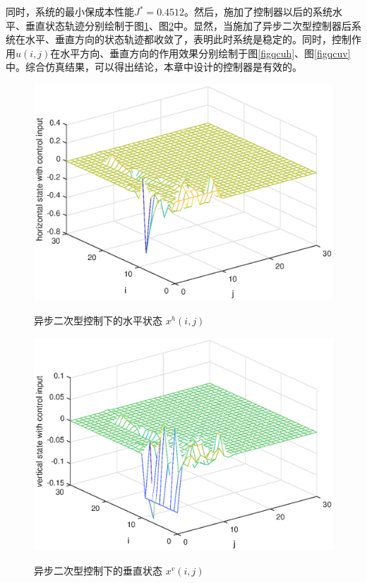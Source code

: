 	同时，系统的最小保成本性能$J^{*}=0.4512$。然后，施加了控制器以后的系统水平、垂直状态轨迹分别绘制于图\ref{figqchstate1}、图\ref{figqcvstate1}中。显然，当施加了异步二次型控制器后系统在水平、垂直方向的状态轨迹都收敛了，表明此时系统是稳定的。同时，控制作用$u(i,j)$在水平方向、垂直方向的作用效果分别绘制于图\ref{figqcuh}、图\ref{figqcuv}中。综合仿真结果，可以得出结论，本章中设计的控制器是有效的。
	\begin{figure}[!htb]
		\centering\includegraphics[scale=0.6]{./figures/qc/simulation/hstate.eps}\\ 
		\caption{异步二次型控制下的水平状态 $x^{h}(i,j)$}
		\label{figqchstate1}
	\end{figure}
	
	\begin{figure}[!htb]
		\centering\includegraphics[scale=0.6]{./figures/qc/simulation/vstate.eps}\\ 
		\caption{异步二次型控制下的垂直状态 $x^{v}(i,j)$}
		\label{figqcvstate1}
	\end{figure}
	
